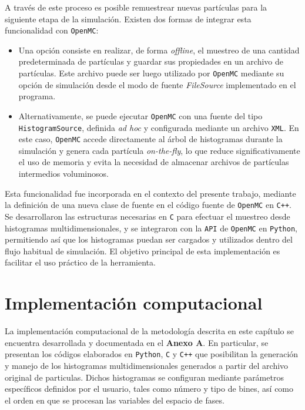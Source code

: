 

A través de este proceso es posible remuestrear nuevas partículas para la siguiente etapa de la simulación. Existen dos formas de integrar esta funcionalidad con \texttt{OpenMC}:

\begin{itemize}
    \item Una opción consiste en realizar, de forma \emph{offline}, el muestreo de una cantidad predeterminada de partículas y guardar sus propiedades en un archivo de partículas. Este archivo puede ser luego utilizado por \texttt{OpenMC} mediante su opción de simulación desde el modo de fuente \textit{FileSource} implementado en el programa.
    
    \item Alternativamente, se puede ejecutar \texttt{OpenMC} con una fuente del tipo \texttt{HistogramSource}, definida \textit{ad hoc} y configurada mediante un archivo \texttt{XML}. En este caso, \texttt{OpenMC} accede directamente al árbol de histogramas durante la simulación y genera cada partícula \emph{on-the-fly}, lo que reduce significativamente el uso de memoria y evita la necesidad de almacenar archivos de partículas intermedios voluminosos.
\end{itemize}

Esta funcionalidad fue incorporada en el contexto del presente trabajo, mediante la definición de una nueva clase de fuente en el código fuente de \texttt{OpenMC} en \texttt{C++}. Se desarrollaron las estructuras necesarias en \texttt{C} para efectuar el muestreo desde histogramas multidimensionales, y se integraron con la \texttt{API} de \texttt{OpenMC} en \texttt{Python}, permitiendo así que los histogramas puedan ser cargados y utilizados dentro del flujo habitual de simulación. El objetivo principal de esta implementación es facilitar el uso práctico de la herramienta.


\section{Implementación computacional}

La implementación computacional de la metodología descrita en este capítulo se encuentra desarrollada y documentada en el \textbf{Anexo A}. En particular, se presentan los códigos elaborados en \texttt{Python}, \texttt{C} y \texttt{C++} que posibilitan la generación y manejo de los histogramas multidimensionales generados a partir del archivo original de particulas. Dichos histogramas se configuran mediante parámetros específicos definidos por el usuario, tales como número y tipo de bines, así como el orden en que se procesan las variables del espacio de fases.

